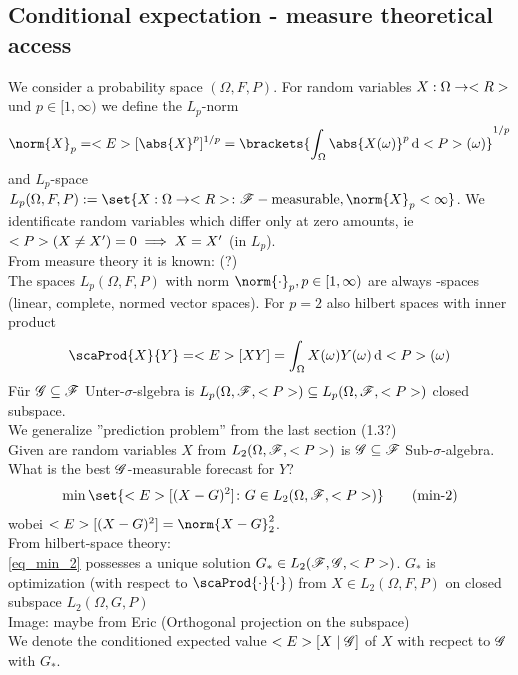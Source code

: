 \subsection{Conditional expectation - measure theoretical access}
We consider a probability space $(\Omega, F,P)$. For random variables $X: \Omega \to \R$ und $p \in [1,\infty)$ we define the $L_p$-norm
\begin{align*}
	\norm{X}_p = \E[\abs{X}^p]^{1/p} = \brackets{\int_{\O} \abs{X(\omega)}^p \d \P(\omega)}^{1/p}
\end{align*}
and $L_p$-space $L_p(\Omega,F,P):= \set{X: \O \to \R\colon \F-\text{measurable}, \norm{X}_p < \infty}$. We identificate random variables which differ only at zero amounts, ie $\P(X \neq X') = 0 \implies X = X'$ (in $L_p$).\\
From measure theory it is known: (?)\\
The spaces $L_p(\Omega,F,P)$ with norm $\norm{\cdot}_p, p \in [1,\infty)$ are always -spaces (linear, complete, normed vector spaces). For $p = 2$ also hilbert spaces with inner product
\begin{align*}
	\scaProd{X}{Y} = \E[XY] = \int_{\O} X(\omega)Y(\omega)\d \P(\omega)
\end{align*}
Für $\G \subseteq \F$ Unter-$\sigma$-slgebra is $L_p(\O,\F,\P) \subseteq L_p(\O,\F,\P)$ closed subspace.\\
We generalize ''prediction problem'' from the last section (1.3?)\\
Given are random variables $X$ from $L_2(\O,\F,\P)$ is $\G \subseteq \F$ Sub-$\sigma$-algebra.\\
What is the best $\G$-measurable forecast for $Y$?
\begin{align*}
	\min\set{\E[(X-G)^2] \colon G \in L_2(\O,\F,\P)} \tag{min-2}\label{eq_min_2}
\end{align*}
wobei $\E[(X-G)^2] = \norm{X-G}^2_2$.\\
From hilbert-space theory:\\
\eqref{eq_min_2} possesses a unique solution $G_{\ast} \in L_2(\F,\G,\P)$. $G_{\ast}$ is optimization (with respect to $\scaProd{\cdot}{\cdot}$) from $X \in L_2(\Omega,F,P)$ on closed subspace $L_2(\Omega,G,P)$\\
Image: maybe from Eric (Orthogonal projection on the subspace)\\
We denote the conditioned expected value $\E[X\mid \G]$ of $X$ with recpect to $\G$ with $G_{\ast}$.
